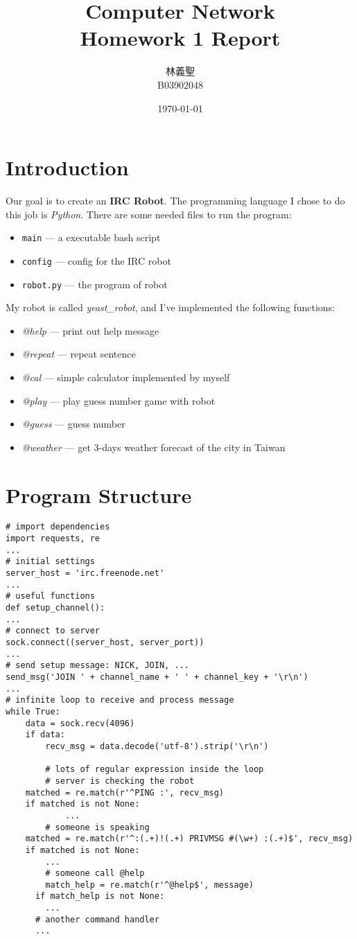 \documentclass[14pt,a4paper]{extarticle}
\title{Computer Network\\ Homework 1 Report}
\author{林義聖\\ B03902048}
\date{\today}
\begin{document}
\maketitle
\thispagestyle{fancy}

\section*{Introduction}

Our goal is to create an \textbf{IRC Robot}. The programming language I chose to do this job is \textit{Python}. There are some needed files to run the program:
\begin{itemize}
	\item \texttt{main} --- a executable bash script
	\item \texttt{config} --- config for the IRC robot
	\item \texttt{robot.py} --- the program of robot
\end{itemize}
My robot is called \textit{yeast\_robot}, and I've implemented the following functions:
\begin{itemize}
	\item \textit{@help} --- print out help message
	\item \textit{@repeat} --- repeat sentence
	\item \textit{@cal} --- simple calculator implemented by myself
	\item \textit{@play} --- play guess number game with robot
	\item \textit{@guess} --- guess number
	\item \textit{@weather} --- get 3-days weather forecast of the city in Taiwan
\end{itemize}

\section*{Program Structure}

\begin{lstlisting}
# import dependencies
import requests, re
...
# initial settings
server_host = 'irc.freenode.net'
...
# useful functions
def setup_channel():
...
# connect to server
sock.connect((server_host, server_port))
...
# send setup message: NICK, JOIN, ...
send_msg('JOIN ' + channel_name + ' ' + channel_key + '\r\n')
...
# infinite loop to receive and process message
while True:
	data = sock.recv(4096)
	if data:
		recv_msg = data.decode('utf-8').strip('\r\n')

		# lots of regular expression inside the loop
		# server is checking the robot
    matched = re.match(r'^PING :', recv_msg)
    if matched is not None:
			...
		# someone is speaking
    matched = re.match(r'^:(.+)!(.+) PRIVMSG #(\w+) :(.+)$', recv_msg)
    if matched is not None:
    	...
    	# someone call @help
    	match_help = re.match(r'^@help$', message)
      if match_help is not None:
      	...
      # another command handler
      ...
\end{lstlisting}
\end{document}
